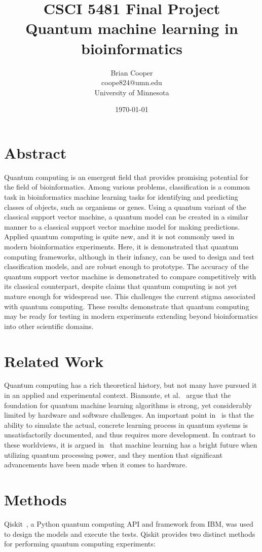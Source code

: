 \documentclass{article}
\title{%
  CSCI 5481 Final Project \\
  \large Quantum machine learning in bioinformatics
}
\author{Brian Cooper \\ coope824@umn.edu \\ University of Minnesota}
\date{\today}
\begin{document}
\maketitle

\section{Abstract}
  Quantum computing is an emergent field that provides promising potential for the field of bioinformatics. Among various problems, classification is a common task in bioinformatics machine learning tasks for identifying and predicting classes of objects, such as organisms or genes. Using a quantum variant of the classical support vector machine, a quantum model can be created in a similar manner to a classical support vector machine model for making predictions. Applied quantum computing is quite new, and it is not commonly used in modern bioinformatics experiments. Here, it is demonstrated that quantum computing frameworks, although in their infancy, can be used to design and test classification models, and are robust enough to prototype. The accuracy of the quantum support vector machine is demonstrated to compare competitively with its classical counterpart, despite claims that quantum computing is not yet mature enough for widespread use. This challenges the current stigma associated with quantum computing. These results demonstrate that quantum computing may be ready for testing in modern experiments extending beyond bioinformatics into other scientific domains.

\section{Related Work}
  Quantum computing has a rich theoretical history, but not many have pursued it in an applied and experimental context. Biamonte, et al.~\cite{biamonte} argue that the foundation for quantum machine learning algorithms is strong, yet considerably limited by hardware and software challenges. An important point in~\cite{schuld} is that the ability to simulate the actual, concrete learning process in quantum systems is unsatisfactorily documented, and thus requires more development. In contrast to these worldviews, it is argued in~\cite{biamonte} that machine learning has a bright future when utilizing quantum processing power, and they mention that significant advancements have been made when it comes to hardware.

\section{Methods}
  Qiskit~\cite{ibm}, a Python quantum computing API and framework from IBM, was used to design the models and execute the tests. Qiskit provides two distinct methods for performing quantum computing experiments:
\end{document}
